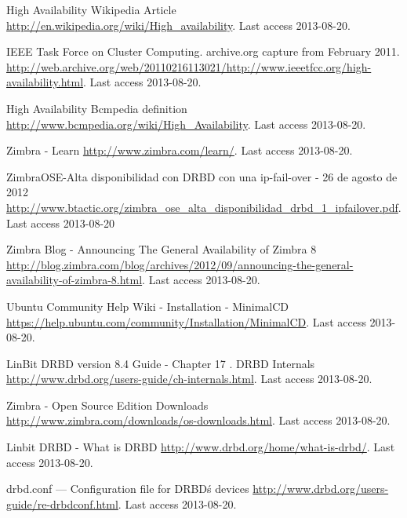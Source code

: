 
\begin{thebibliography}{1}


 High Availability Wikipedia Article
\url{http://en.wikipedia.org/wiki/High_availability}. Last access 2013-08-20.

 IEEE Task Force on Cluster Computing. archive.org capture from February 2011.
\url{http://web.archive.org/web/20110216113021/http://www.ieeetfcc.org/high-availability.html}. Last access 2013-08-20.

 High Availability Bcmpedia definition
\url{http://www.bcmpedia.org/wiki/High_Availability}. Last access 2013-08-20.

 Zimbra - Learn
\url{http://www.zimbra.com/learn/}. Last access 2013-08-20.

 ZimbraOSE-Alta disponibilidad con DRBD con una ip-fail-over - 26 de agosto de 2012
\url{http://www.btactic.org/zimbra_ose_alta_disponibilidad_drbd_1_ipfailover.pdf}. Last access 2013-08-20

 Zimbra Blog - Announcing The General Availability of Zimbra 8
\url{http://blog.zimbra.com/blog/archives/2012/09/announcing-the-general-availability-of-zimbra-8.html}. Last access 2013-08-20.


 Ubuntu Community Help Wiki - Installation - MinimalCD
\url{https://help.ubuntu.com/community/Installation/MinimalCD}. Last access 2013-08-20.

 LinBit DRBD version 8.4 Guide - Chapter 17 . DRBD Internals
\url{http://www.drbd.org/users-guide/ch-internals.html}. Last access 2013-08-20.


 Zimbra - Open Source Edition Downloads
\url{http://www.zimbra.com/downloads/os-downloads.html}. Last access 2013-08-20.


 Linbit DRBD - What is DRBD
\url{http://www.drbd.org/home/what-is-drbd/}. Last access 2013-08-20.

 drbd.conf — Configuration file for DRBD\'s devices
\url{http://www.drbd.org/users-guide/re-drbdconf.html}. Last access 2013-08-20.

\end{thebibliography}

